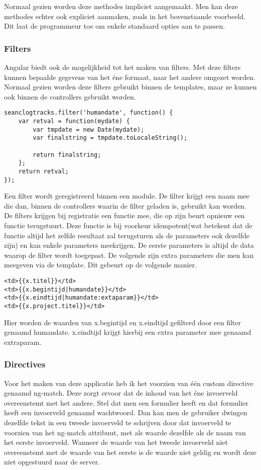 \documentclass[a4paper,11pt]{article}
\begin{document}
Normaal gezien worden deze methodes impliciet aangemaakt. Men kan deze methodes echter ook expliciet aanmaken, zoals in het bovenstaande voorbeeld. Dit laat de programmeur toe om enkele standaard opties aan te passen.

\subsubsection{Filters}
Angular biedt ook de mogelijkheid tot het maken van filters. Met deze filters kunnen bepaalde gegevens van het éne formaat, naar het andere omgezet worden. Normaal gezien worden deze filters gebruikt binnen de templates, maar ze kunnen ook binnen de controllers gebruikt worden.
\begin{lstlisting}
seanclogtracks.filter('humandate', function() {
	var retval = function(mydate) {
		var tmpdate = new Date(mydate);
		var finalstring = tmpdate.toLocaleString();
		
		return finalstring;
	};
	return retval;
});
\end{lstlisting}
Een filter wordt geregistreerd binnen een module.\cite{angular:filters} De filter krijgt een naam mee die dan, binnen de controllers waarin de filter geladen is, gebruikt kan worden. De filters krijgen bij registratie een functie mee, die op zijn beurt opnieuw een functie terugstuurt. Deze functie is bij voorkeur idempotent(wat betekent dat de functie altijd het zelfde resultaat zal terugsturen als de parameters ook dezelfde zijn) en kan enkele parameters meekrijgen. De eerste parameters is altijd de data waarop de filter wordt toegepast. De volgende zijn extra parameters die men kan meegeven via de template. Dit gebeurt op de volgende manier.
\begin{lstlisting}
<td>{{x.titel}}</td>
<td>{{x.begintijd|humandate}}</td>
<td>{{x.eindtijd|humandate:extaparam}}</td>
<td>{{x.project.titel}}</td>
\end{lstlisting}
Hier worden de waarden van x.begintijd en x.eindtijd gefilterd door een filter genaamd humandate. x.eindtijd krijgt hierbij een extra parameter mee genaamd extraparam.
\subsubsection{Directives}
Voor het maken van deze applicatie heb ik het voorzien van één custom directive genaamd ng-match. Deze zorgt ervoor dat de inhoud van het éne invoerveld overeenstemt met het andere. Stel dat men een formulier heeft en dat formulier heeft een invoerveld genaamd wachtwoord. Dan kan men de gebruiker dwingen dezelfde tekst in een tweede invoerveld te schrijven door dat invoerveld te voorzien van het ng-match attribuut, met als waarde dezelfde als de naam van het eerste invoerveld. Wanneer de waarde van het tweede invoerveld niet overeenstemt met de waarde van het eerste is de waarde niet geldig en wordt deze niet opgestuurd naar de server. \cite{angular:directives}
\end{document}
